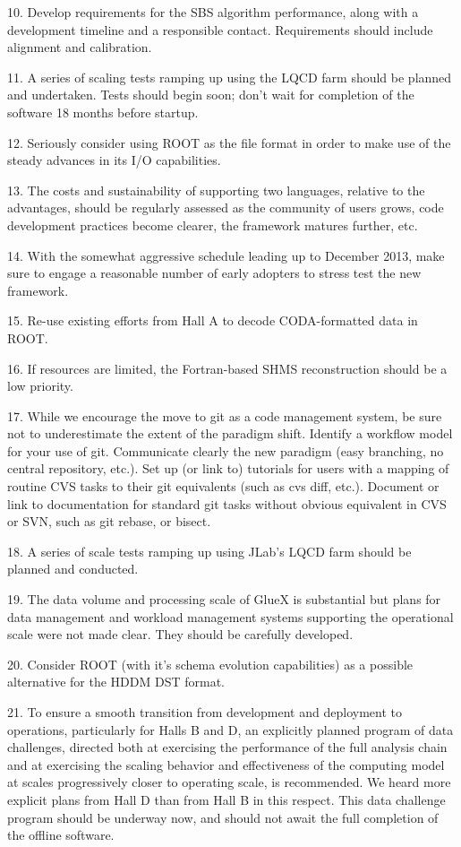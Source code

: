 \documentclass[12pt]{article}
\begin{document}
\begin{enumerate}
10. Develop requirements for the SBS algorithm performance, along with a development timeline and a responsible contact. Requirements should include alignment and calibration.

11. A series of scaling tests ramping up using the LQCD farm should be planned and undertaken. Tests should begin soon; don’t wait for completion of the software 18 months before startup.

12. Seriously consider using ROOT as the file format in order to make use of the steady advances in its I/O capabilities.

13. The costs and sustainability of supporting two languages, relative to the advantages, should be regularly assessed as the community of users grows, code development practices become clearer, the framework matures further, etc.

14. With the somewhat aggressive schedule leading up to December 2013, make sure to engage a reasonable number of early adopters to stress test the new framework.

15. Re-use existing efforts from Hall A to decode CODA-formatted data in ROOT.

16. If resources are limited, the Fortran-based SHMS reconstruction should be a low priority.

17. While we encourage the move to git as a code management system, be sure not to underestimate the extent of the paradigm shift. Identify a workflow model for your use of git. Communicate clearly the new paradigm (easy branching, no central repository, etc.). Set up (or link to) tutorials for users with a mapping of routine CVS tasks to their git equivalents (such as cvs diff, etc.). Document or link to documentation for standard git tasks without obvious equivalent in CVS or SVN, such as git rebase, or bisect.

18. A series of scale tests ramping up using JLab’s LQCD farm should be planned and conducted.

19. The data volume and processing scale of GlueX is substantial but plans for data management and workload management systems supporting the operational scale were not made clear. They should be carefully developed.

20. Consider ROOT (with it’s schema evolution capabilities) as a possible alternative for the HDDM DST format.

21. To ensure a smooth transition from development and deployment to operations, particularly for Halls B and D, an explicitly planned program of data challenges, directed both at exercising the performance of the full analysis chain and at exercising the scaling behavior and effectiveness of the computing model at scales progressively closer to operating scale, is recommended. We heard more explicit plans from Hall D than from Hall B in this respect. This data challenge program should be underway now, and should not await the full completion of the offline software.


\end{enumerate}
\end{document}
